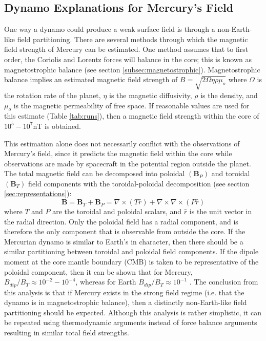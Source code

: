 \subsection{Dynamo Explanations for Mercury's Field}
One way a dynamo could produce a weak surface field is through a non-Earth-like field partitioning. There are several methods through which the magnetic field strength of Mercury can be estimated. One method assumes that to first order, the Coriolis and Lorentz forces will balance in the core; this is known as magnetostrophic balance (see section \ref{subsec:magnetostrophic}). Magnetostrophic balance implies an estimated magnetic field strength of $B=\sqrt{2\Omega\eta\rho\mu_{o}}$ where $\Omega$ is the rotation rate of the planet, $\eta$ is the magnetic diffusivity, $\rho$ is the density, and $\mu_o$ is the magnetic permeability of free space. If reasonable values are used for this estimate (Table \ref{tab:runs}), then a magnetic field strength within the core of $10^{5}-10^{7}$nT is obtained.

This estimation alone does not necessarily conflict with the observations of Mercury's field, since it predicts the magnetic field within the core while observations are made by spacecraft in the potential region outside the planet. The total magnetic field can be decomposed into poloidal $(\mathbf{B}_{P})$ and toroidal $(\mathbf{B}_{T})$ field components with the toroidal-poloidal  decomposition (see section \ref{sec:representations}):
\begin{equation}
\mathbf{B}=\mathbf{B}_{T}+\mathbf{B}_{P}=\nabla\times\left(T\hat{r}\right)+\nabla\times\nabla\times\left(P\hat{r}\right)
\end{equation}
where $T$ and $P$ are the toroidal and poloidal scalars, and $\hat{r}$ is the unit vector in the radial direction. Only the poloidal field has a radial component, and is therefore the only component that is observable from outside the core. If the Mercurian dynamo is similar to Earth's in character, then there should be a similar partitioning between toroidal and poloidal field components. If the dipole moment at the core mantle boundary (CMB) is taken to be representative of the poloidal component, then it can be shown that for Mercury, $B_{dip}/B_{T}\approx10^{-2}-10^{-4}$, whereas for Earth $B_{dip}/B_{T} \approx 10^{-1}$  \citep{stevenson87}. The conclusion from this analysis is that if Mercury exists in the strong field regime (i.e. that the dynamo is in magnetostrophic balance), then a distinctly non-Earth-like field partitioning should be expected. Although this analysis is rather simplistic, it can be repeated using thermodynamic arguments instead of force balance arguments \citep{schubertandross88,stevenson87} resulting in similar total field strengths.


